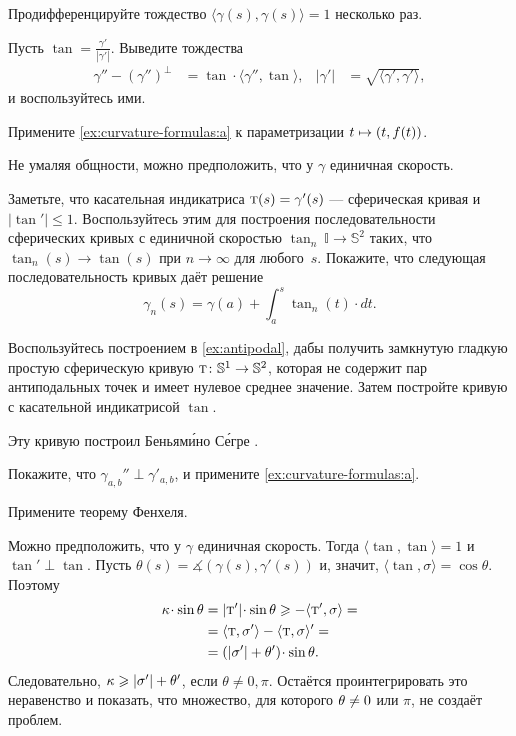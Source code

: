 Продифференцируйте тождество $\langle\gamma(s),\gamma(s)\rangle=1$ несколько раз.

Пусть $\tan=\tfrac{\gamma'}{|\gamma'|}$.
Выведите  тождества
\begin{align*}
\gamma''-(\gamma'')^\perp&=\tan\cdot\langle\gamma'',\tan\rangle,
&
|\gamma'|&=\sqrt{\langle \gamma',\gamma'\rangle},
\end{align*}
и воспользуйтесь ими.

Примените \ref{ex:curvature-formulas:a} к параметризации $t\z\mapsto (t,f(t))$.

Не умаляя общности, можно предположить, что у $\gamma$ единичная скорость.

Заметьте, что касательная индикатриса $\tan(s)\z=\gamma'(s)$ --- сферическая кривая и $|\tan'|\le 1$.
Воспользуйтесь этим для построения последовательности сферических кривых с единичной скоростью $\tan_n\:\mathbb{I}\to\mathbb{S}^2$ таких, что $\tan_n(s)\to \tan(s)$ при $n\to\infty$ для любого~$s$.
Покажите, что следующая последовательность кривых даёт решение
\[\gamma_n(s)=\gamma(a)+\int_a^s\tan_n(t)\cdot dt.\]

Воспользуйтесь построением в \ref{ex:antipodal}, дабы получить замкнутую гладкую простую сферическую кривую $\tan\:\mathbb{S}^1\z\to\mathbb{S}^2$, которая не содержит пар антиподальных точек и имеет нулевое среднее значение.
Затем постройте кривую с касательной индикатрисой $\tan$.

Эту кривую построил Беньям\'{и}но С\'{е}гре \cite{segre}.

Покажите, что $\gamma_{a,b}''\perp \gamma'_{a,b}$, и примените \ref{ex:curvature-formulas:a}.

Примените теорему Фенхеля.

Можно предположить, что у $\gamma$ единичная скорость.
Тогда $\langle\tan,\tan\rangle=1$ и  $\tan'\perp \tan$.
Пусть $\theta(s)=\measuredangle(\gamma(s),\gamma'(s))$ и, значит, $\langle \tan,\sigma\rangle=\cos\theta$.
Поэтому
\begin{align*}
\kur\cdot \sin\theta
&=|\tan'|\cdot \sin\theta\ge
-\langle \tan',\sigma\rangle=
\\
&=
\langle \tan,\sigma'\rangle-\langle \tan,\sigma\rangle'=
\\
&=
(|\sigma'|+\theta')\cdot \sin\theta.
\end{align*}
Следовательно, $\kappa\geqslant |\sigma'|+\theta'$,
если $\theta\ne0,\pi$.
Остаётся проинтегрировать это неравенство и показать, что множество, для которого $\theta\z\ne0$ или $\pi$, не создаёт проблем.

